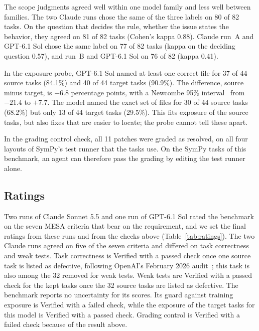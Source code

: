 \documentclass[runningheads]{llncs}
\begin{document}
The scope judgments agreed well within one model family and less well between families. The two Claude runs chose the same of the three labels on 80 of 82 tasks. On the question that decides the rule, whether the issue states the behavior, they agreed on 81 of 82 tasks (Cohen's kappa 0.88). Claude run~A and GPT-6.1 Sol chose the same label on 77 of 82 tasks (kappa on the deciding question 0.57), and run~B and GPT-6.1 Sol on 76 of 82 (kappa 0.41).

In the exposure probe, GPT-6.1 Sol named at least one correct file for 37 of 44 source tasks (84.1\%) and 40 of 44 target tasks (90.9\%). The difference, source minus target, is $-6.8$ percentage points, with a Newcombe 95\% interval~\cite{newcombe_difference_1998} from $-21.4$ to $+7.7$. The model named the exact set of files for 30 of 44 source tasks (68.2\%) but only 13 of 44 target tasks (29.5\%). This fits exposure of the source tasks, but also fixes that are easier to locate; the probe cannot tell these apart.

In the grading control check, all 11 patches were graded as resolved, on all four layouts of SymPy's test runner that the tasks use. On the SymPy tasks of this benchmark, an agent can therefore pass the grading by editing the test runner alone.

\subsection{Ratings}
Two runs of Claude Sonnet 5.5 and one run of GPT-6.1 Sol rated the benchmark on the seven MESA criteria that bear on the requirement, and we set the final ratings from these runs and from the checks above (Table~\ref{tab:ratings}). The two Claude runs agreed on five of the seven criteria and differed on task correctness and weak tests. Task correctness is Verified with a passed check once one source task is listed as defective, following OpenAI's February 2026 audit~\cite{openai_swebench_verified_contamination_2025}; this task is also among the 32 removed for weak tests. Weak tests are Verified with a passed check for the kept tasks once the 32 source tasks are listed as defective. The benchmark reports no uncertainty for its scores. Its guard against training exposure is Verified with a failed check, while the exposure of the target tasks for this model is Verified with a passed check. Grading control is Verified with a failed check because of the result above.
\end{document}
